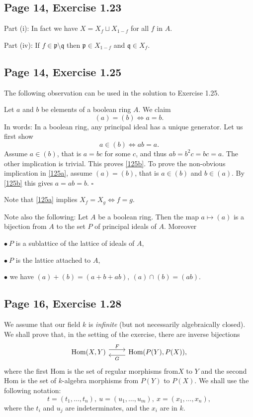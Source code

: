 \documentclass[parskip=half,fontsize=12pt]{scrartcl}%
\newcommand{\mf}{\mathfrak}
\newcommand{\ppp}{\mf p}
\begin{document}
\subsection{Page 14, Exercise 1.23}%

Part (i): In fact we have $X=X_f\sqcup X_{1-f}$ for all $f$ in $A$.

Part (iv): If $f\in\ppp\setminus\mf q$ then $\ppp\in X_{1-f}$ and $\mf q\in X_f$.

\subsection{Page 14, Exercise 1.25}%

The following observation can be used in the solution to Exercise 1.25.

Let $a$ and $b$ be elements of a boolean ring $A$. We claim
\begin{equation}\label{125a}
(a)=(b)\iff a=b.
\end{equation} 
In words: In a boolean ring, any principal ideal has a unique generator. Let us first show 
\begin{equation}\label{125b}
a\in(b)\iff ab=a.
\end{equation}
Assume $a\in(b)$, that is $a=bc$ for some $c$, and thus $ab=b^2c=bc=a$. The other implication is trivial. This proves \eqref{125b}. To prove the non-obvious implication in \eqref{125a}, assume $(a)=(b)$, that is $a\in(b)$ and $b\in(a)$. By \eqref{125b} this gives $a=ab=b$. $\square$

Note that \eqref{125a} implies $X_f=X_g\iff f=g$.

Note also the following: Let $A$ be a boolean ring. Then the map $a\mapsto(a)$ is a bijection from $A$ to the set $P$ of principal ideals of $A$. Moreover 

$\bullet\ P$ is a sublattice of the lattice of ideals of $A$, 

$\bullet\  P$ is the lattice attached to $A$,

$\bullet$ we have $(a)+(b)=(a+b+ab),\ (a)\cap(b)=(ab)$.

\subsection{Page 16, Exercise 1.28}%

We assume that our field $k$ is \emph{infinite} (but not necessarily algebraically closed). We shall prove that, in the setting of the exercise, there are inverse bijections 
$$
\begin{tikzcd}
\text{Hom}(X,Y)\ar[r,yshift=4pt,"F"]&\text{Hom}(P(Y),P(X))\ar[l,yshift=-4pt,"G"],
\end{tikzcd}
$$ 
where the first $\text{Hom}$ is the set of regular morphisms from$X$ to $Y$ and the second $\text{Hom}$ is the set of $k$-algebra morphisms from $P(Y)$ to $P(X)$. We shall use the following notation:
$$
t=(t_1,\dots,t_n),\ u=(u_1,\dots,u_m),\ x=(x_1,\dots,x_n),%
$$ 
where the $t_i$ and $u_j$ are indeterminates, and the $x_i$ %
are in $k$.
\end{document}
